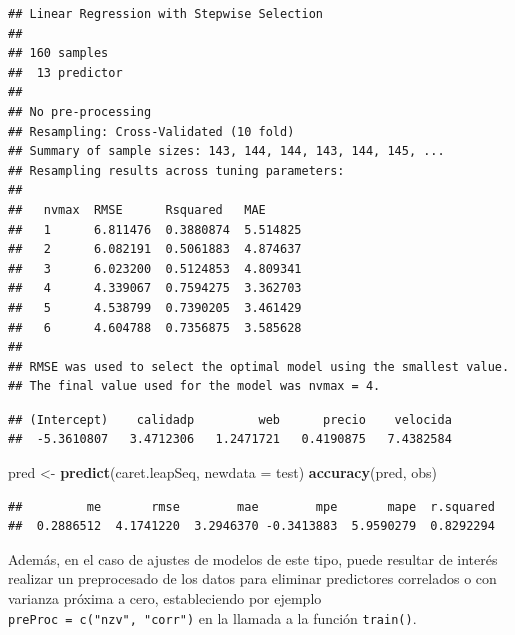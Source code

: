 \documentclass[
]{book}
\newenvironment{Shaded}{\begin{snugshade}}{\end{snugshade}}
\newcommand{\CommentTok}[1]{\textcolor[rgb]{0.56,0.35,0.01}{\textit{#1}}}
\newcommand{\DataTypeTok}[1]{\textcolor[rgb]{0.13,0.29,0.53}{#1}}
\newcommand{\KeywordTok}[1]{\textcolor[rgb]{0.13,0.29,0.53}{\textbf{#1}}}
\newcommand{\NormalTok}[1]{#1}
\newcommand{\OperatorTok}[1]{\textcolor[rgb]{0.81,0.36,0.00}{\textbf{#1}}}
\newcommand{\StringTok}[1]{\textcolor[rgb]{0.31,0.60,0.02}{#1}}
\theoremstyle{break}
\theoremstyle{definition}
\theoremstyle{definition}
\theoremstyle{definition}
\theoremstyle{remark}
\begin{document}
\begin{verbatim}
## Linear Regression with Stepwise Selection 
## 
## 160 samples
##  13 predictor
## 
## No pre-processing
## Resampling: Cross-Validated (10 fold) 
## Summary of sample sizes: 143, 144, 144, 143, 144, 145, ... 
## Resampling results across tuning parameters:
## 
##   nvmax  RMSE      Rsquared   MAE     
##   1      6.811476  0.3880874  5.514825
##   2      6.082191  0.5061883  4.874637
##   3      6.023200  0.5124853  4.809341
##   4      4.339067  0.7594275  3.362703
##   5      4.538799  0.7390205  3.461429
##   6      4.604788  0.7356875  3.585628
## 
## RMSE was used to select the optimal model using the smallest value.
## The final value used for the model was nvmax = 4.
\end{verbatim}

\begin{Shaded}
\end{Shaded}

\begin{verbatim}
## (Intercept)    calidadp         web      precio    velocida 
##  -5.3610807   3.4712306   1.2471721   0.4190875   7.4382584
\end{verbatim}

\begin{Shaded}
\begin{Highlighting}[]
\NormalTok{pred <-}\StringTok{ }\KeywordTok{predict}\NormalTok{(caret.leapSeq, }\DataTypeTok{newdata =}\NormalTok{ test)}
\KeywordTok{accuracy}\NormalTok{(pred, obs)}
\end{Highlighting}
\end{Shaded}

\begin{verbatim}
##         me       rmse        mae        mpe       mape  r.squared 
##  0.2886512  4.1741220  3.2946370 -0.3413883  5.9590279  0.8292294
\end{verbatim}

Además, en el caso de ajustes de modelos de este tipo, puede resultar de interés realizar un preprocesado de los datos para eliminar predictores correlados o con varianza próxima a cero,
estableciendo por ejemplo \texttt{preProc\ =\ c("nzv",\ "corr")} en la llamada a la función \texttt{train()}.
\end{document}
